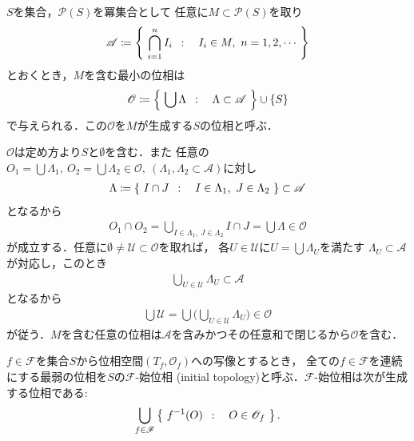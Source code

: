	\begin{screen}
		\begin{thm}[位相の生成]
			$S$を集合，$\mathcal{P}(S)$を冪集合として
			任意に$M \subset \mathcal{P}(S)$を取り
			\begin{align}
				\mathscr{A} \coloneqq
				\left\{\ \bigcap_{i=1}^n I_i\ \, : \quad I_i \in M,\ n = 1,2,\cdots\ \right\}
			\end{align}
			とおくとき，$M$を含む最小の位相は
			\begin{align}
				\mathscr{O} \coloneqq
				\left\{\ \bigcup \Lambda\ \, : \quad \Lambda \subset \mathscr{A}\ \right\}
				\cup \{S\}
			\end{align}
			で与えられる．この$\mathscr{O}$を$M$が生成する$S$の位相と呼ぶ．
		\end{thm}
	\end{screen}
	
	\begin{prf}
		$\mathscr{O}$は定め方より$S$と$\emptyset$を含む．また
		任意の$O_1 = \bigcup \Lambda_1,\ O_2=\bigcup \Lambda_2 \in \mathscr{O},\ 
		(\Lambda_1,\Lambda_2 \subset \mathscr{A})$に対し
		\begin{align}
			\Lambda \coloneqq
			\left\{\ I \cap J\ \, : \quad I \in \Lambda_1,\ J \in \Lambda_2\ \right\} \subset \mathscr{A}
		\end{align}
		となるから
		\begin{align}
			O_1 \cap O_2 = \bigcup_{I \in \Lambda_1,\ J \in \Lambda_2} I \cap J
			= \bigcup \Lambda \in \mathscr{O}
		\end{align}
		が成立する．任意に$\emptyset \neq \mathscr{U} \subset \mathscr{O}$を取れば，
		各$U \in \mathscr{U}$に$U = \bigcup \Lambda_U$を満たす
		$\Lambda_U \subset \mathscr{A}$が対応し，このとき
		\begin{align}
			\bigcup_{U \in \mathscr{U}} \Lambda_U \subset \mathscr{A}
		\end{align}
		となるから
		\begin{align}
			\bigcup \mathscr{U} = \bigcup \Biggl(\bigcup_{U \in \mathscr{U}} \Lambda_U\Biggr)
			\in \mathscr{O}
		\end{align}
		が従う．$M$を含む任意の位相は$\mathscr{A}$を含みかつその任意和で閉じるから$\mathscr{O}$を含む．
		\QED
	\end{prf}
	
	\begin{screen}
		\begin{dfn}[始位相]
			$f \in \mathscr{F}$を集合$S$から位相空間$(T_f,\mathscr{O}_f)$への写像とするとき，
			全ての$f \in \mathscr{F}$を連続にする最弱の位相を$S$の$\mathscr{F}$-始位相
			(initial topology)と呼ぶ．$\mathscr{F}$-始位相は次が生成する位相である:
			\begin{align}
				\bigcup_{f \in \mathscr{F}} \left\{\ f^{-1}(O)\ \, : \quad O \in \mathscr{O}_f\ \right\}.
			\end{align}
		\end{dfn}
	\end{screen}
	
